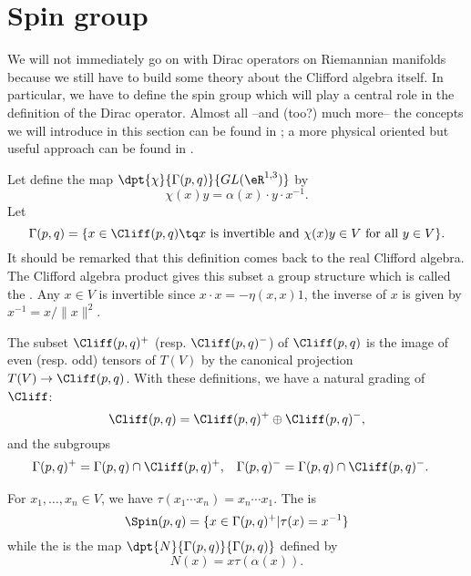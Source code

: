 \section{Spin group}

We will not immediately go on with Dirac operators on Riemannian manifolds because we still have to build some theory about the Clifford algebra itself. In particular, we have to define the spin group which will play a central role in the definition of the Dirac operator. Almost all --and (too?) much more-- the concepts we will introduce in this section can be found in \cite{Chevalley}; a more physical oriented but useful approach can be found in \cite{Preparation}.

Let define the map $\dpt{\chi}{\Gamma(p,q)}{GL(\eR^{1,3})}$ by
\begin{equation}
	\chi(x)y=\alpha(x)\cdot y\cdot x^{-1}.
\end{equation}
Let
\[
	\Gamma(p,q)=\{x\in\Cliff(p,q)\tq\textrm{$x$ is invertible and }  \chi(x)y  \in V\textrm{ for all $y\in V$}\}.
\]
It should be remarked that this definition comes back to the real Clifford algebra. The Clifford algebra product gives this subset a group structure which is called the . Any $x\in V$ is invertible since $x\cdot x=-\eta(x,x)1$, the inverse of $x$ is given by $x^{-1}=x/\|x\|^2$.

The subset $\Cliff(p,q)^+$ (resp. $\Cliff(p,q)^-$) of $\Cliff(p,q)$ is the image of even (resp. odd) tensors of $T(V)$ by the canonical projection $T(V)\to\Cliff(p,q)$. With these definitions, we have a natural grading of $\Cliff$:
\begin{equation}
	\label{directC}\Cliff(p,q)=\Cliff(p,q)^+\oplus\Cliff(p,q)^-,
\end{equation}
and the subgroups
\begin{align}
	\label{defgplus}
	\Gamma(p,q)^+ & =\Gamma(p,q)\cap\Cliff(p,q)^+, & \Gamma(p,q)^- & =\Gamma(p,q)\cap\Cliff(p,q)^-.
\end{align}

For $x_1,\ldots,x_n\in V$, we have $\tau(x_1\cdots x_n)=x_n\cdots x_1$.  The  is
\begin{equation}   \label{defSpinun}
	\Spin(p,q)=\{x\in\Gamma(p,q)^+\vert\tau(x)=x^{-1}\}
\end{equation}
while the  is the map $\dpt{N}{\Gamma(p,q)}{\Gamma(p,q)}$ defined by
\[
	N(x)=x\tau(\alpha(x)).
\]

